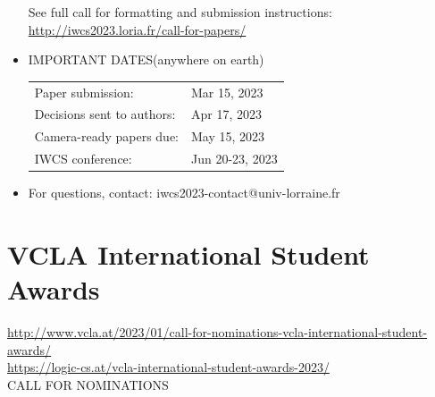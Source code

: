 \documentclass[prodmode,acmtecs]{acmsmall} %
\begin{document}
\begin{itemize}
  See full call for formatting and submission instructions: \href{http://iwcs2023.loria.fr/call-for-papers/}{http://iwcs2023.loria.fr/call-for-papers/} 
 
\item  IMPORTANT DATES(anywhere on earth) 
 
\begin{tabulary}{\linewidth}{LL}Paper submission:  & Mar 15, 2023 \\
Decisions sent to authors:  & Apr 17, 2023 \\
Camera-ready papers due:  & May 15, 2023 \\
IWCS conference:  & Jun 20-23, 2023 \\
\end{tabulary}
 
\item   For questions, contact: iwcs2023-contact@univ-lorraine.fr 
 
\end{itemize}\section{VCLA International Student Awards}\label{VCLAInternationalStudentAwards}  \href{http://www.vcla.at/2023/01/call-for-nominations-vcla-international-student-awards/}{http://www.vcla.at/2023/01/call-for-nominations-vcla-international-student-awards/}\\ 
  \href{https://logic-cs.at/vcla-international-student-awards-2023/}{https://logic-cs.at/vcla-international-student-awards-2023/}\\ 
CALL FOR NOMINATIONS 
\end{document}
